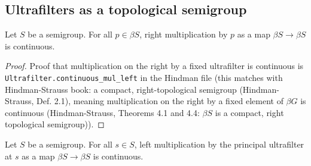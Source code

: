 


    

\subsection{Ultrafilters as a topological semigroup}


\begin{theorem}
\label{thm_ultra_right_mult_continuous}
\leanok{}
    Let $S$ be a semigroup.  For all $p \in \beta S$, right multiplication by $p$ as a map $\beta S \to \beta S$ is continuous.
\end{theorem}

\begin{proof}
    Proof that multiplication on the right by a fixed ultrafilter is continuous is \verb|Ultrafilter.continuous_mul_left| in the Hindman file (this matches with Hindman-Strauss book: a compact, right-topological semigroup (Hindman-Strauss, Def. 2.1), meaning multiplication on the right by a fixed element of $\beta G$ is continuous (Hindman-Strauss, Theorems 4.1 and 4.4: $\beta S$ is a compact, right topological semigroup)).
\end{proof}

\begin{theorem}
\label{lemma_left_multiplication_is_continuous}
\leanok{}
    Let $S$ be a semigroup.  For all $s \in S$, left multiplication by the principal ultrafilter at $s$ as a map $\beta S \to \beta S$ is continuous.
\end{theorem}

